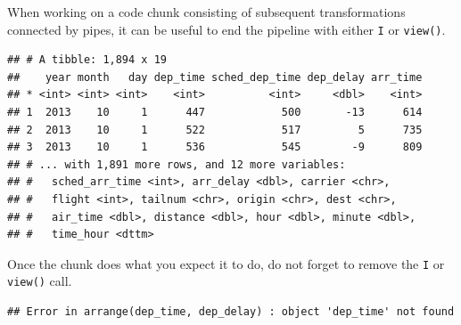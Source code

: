 \documentclass[]{book}
\newenvironment{Shaded}{}{}
\newcommand{\DecValTok}[1]{#1}
\newcommand{\KeywordTok}[1]{\textcolor[rgb]{0.00,0.00,1.00}{#1}}
\newcommand{\NormalTok}[1]{#1}
\newcommand{\OperatorTok}[1]{#1}
\newcommand{\StringTok}[1]{\textcolor[rgb]{0.00,0.50,0.50}{#1}}
\begin{document}
When working on a code chunk consisting of subsequent transformations connected by pipes, it can be useful to end the pipeline with either \texttt{I} or \texttt{view()}.

\begin{Shaded}
\end{Shaded}

\begin{verbatim}
## # A tibble: 1,894 x 19
##    year month   day dep_time sched_dep_time dep_delay arr_time
## * <int> <int> <int>    <int>          <int>     <dbl>    <int>
## 1  2013    10     1      447            500       -13      614
## 2  2013    10     1      522            517         5      735
## 3  2013    10     1      536            545        -9      809
## # ... with 1,891 more rows, and 12 more variables:
## #   sched_arr_time <int>, arr_delay <dbl>, carrier <chr>,
## #   flight <int>, tailnum <chr>, origin <chr>, dest <chr>,
## #   air_time <dbl>, distance <dbl>, hour <dbl>, minute <dbl>,
## #   time_hour <dttm>
\end{verbatim}

\begin{Shaded}
\end{Shaded}

Once the chunk does what you expect it to do, do not forget to remove the \texttt{I} or \texttt{view()} call.

\begin{Shaded}
\end{Shaded}

\begin{verbatim}
## Error in arrange(dep_time, dep_delay) : object 'dep_time' not found
\end{verbatim}
\end{document}

